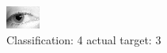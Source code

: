 \begin{figure}[h!]
\begin{center}
\includegraphics[width=0.60\columnwidth]{figures/ID1343_class_4_target_3.png}
\end{center}
\caption{ Classification: 4 actual target: 3}
\label{fig:ID1343_class_4_target_3}
\end{figure}
